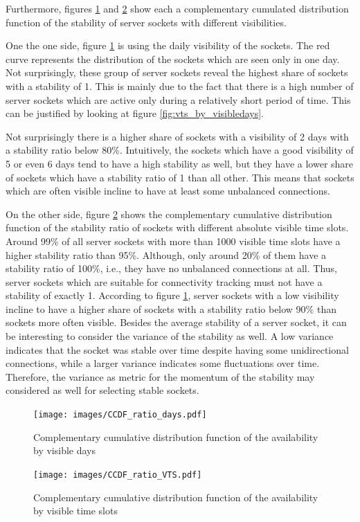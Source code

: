 Furthermore, figures \ref{fig:ccdf_ratio_days} and \ref{fig:ccdf_ratio_vts} show each a complementary cumulated distribution function of the stability of server sockets with different visibilities.

One the one side, figure \ref{fig:ccdf_ratio_days} is using the daily visibility of the sockets. 
The red curve represents the distribution of the sockets which are seen only in one day. 
Not surprisingly, these group of \glspl{server socket} reveal the highest share of sockets with a stability of 1. 
This is mainly due to the fact that there is a high number of \glspl{server socket} which are active only during a relatively short period of time. This can be justified by looking at figure \ref{fig:vts_by_visibledays}.

Not surprisingly there is a higher share of sockets with a visibility of 2 days with a stability ratio below 80\%. 
Intuitively, the sockets which have a good visibility of 5 or even 6 days tend to have a high stability as well, but they have a lower share of sockets which have a stability ratio of 1 than all other. 
This means that sockets which are often visible incline to have at least some unbalanced connections.

On the other side, figure \ref{fig:ccdf_ratio_vts} shows the complementary cumulative distribution function of the stability ratio of sockets with different absolute visible time slots. 
Around 99\% of all \glspl{server socket} with more than 1000 visible time slots have a higher stability ratio than 95\%. 
Although, only around 20\% of them have a stability ratio of 100\%, i.e., they have no unbalanced connections at all. 
Thus, server sockets which are suitable for connectivity tracking must not have a stability of exactly 1. 
According to figure \ref{fig:ccdf_ratio_days}, \glspl{server socket} with a low visibility incline to have a higher share of sockets with a stability ratio below 90\% than sockets more often visible.
Besides the average stability of a server socket, it can be interesting to consider the variance of the stability as well. 
A low variance indicates that the socket was stable over time despite having some unidirectional connections, while a larger variance indicates some fluctuations over time. 
Therefore, the variance as metric for the momentum of the stability may considered as well for selecting stable sockets. 

\begin{landscape}
	\begin{figure}
		[p] \centering 
		\texttt{[image: images/CCDF\_ratio\_days.pdf]} \caption{Complementary cumulative distribution function of the availability by visible days} 
		\label{fig:ccdf_ratio_days} 
	\end{figure}
\end{landscape}
\begin{landscape}
	\begin{figure}
		[p] \centering 
		\texttt{[image: images/CCDF\_ratio\_VTS.pdf]} \caption{Complementary cumulative distribution function of the availability by visible time slots} 
		\label{fig:ccdf_ratio_vts} 
	\end{figure}
\end{landscape}

